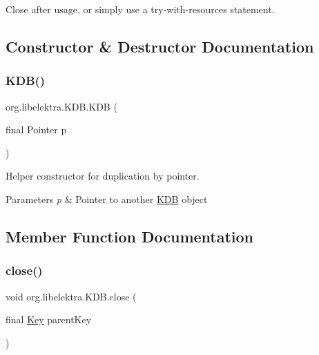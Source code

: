 Close after usage, or simply use a try-\/with-\/resources statement. 

\subsection{Constructor \& Destructor Documentation}
\mbox{\label{classorg_1_1libelektra_1_1KDB_a256255ad383403a2efe699c4ccc4fe12}} 
\subsubsection{\texorpdfstring{K\+D\+B()}{KDB()}}
{\footnotesize\ttfamily org.\+libelektra.\+K\+D\+B.\+K\+DB (\begin{DoxyParamCaption}\item[{final Pointer}]{p }\end{DoxyParamCaption})\hspace{0.3cm}{\ttfamily [inline]}}



Helper constructor for duplication by pointer. 


\begin{DoxyParams}{Parameters}
{\em p} & Pointer to another \hyperlink{classorg_1_1libelektra_1_1KDB}{K\+DB} object \\
\hline
\end{DoxyParams}


\subsection{Member Function Documentation}
\mbox{\label{classorg_1_1libelektra_1_1KDB_af6b472eadf78ba4ed216303b52ddb29e}} 
\subsubsection{\texorpdfstring{close()}{close()}}
{\footnotesize\ttfamily void org.\+libelektra.\+K\+D\+B.\+close (\begin{DoxyParamCaption}\item[{final \hyperlink{classorg_1_1libelektra_1_1Key}{Key}}]{parent\+Key }\end{DoxyParamCaption})\hspace{0.3cm}{\ttfamily [inline]}}



